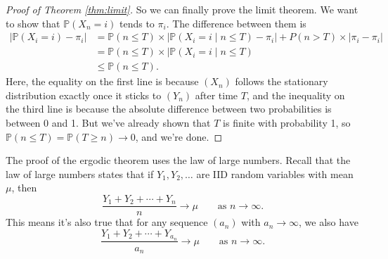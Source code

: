 \documentclass[
  a4paper,
]{article}
\theoremstyle{definition}
\theoremstyle{definition}
\theoremstyle{definition}
\theoremstyle{remark}
\begin{document}
\begin{proof}[Proof of Theorem \ref{thm:limit}]
So we can finally prove the limit theorem. We want to show that \(\mathbb P(X_n = i)\) tends to \(\pi_i\). The difference between them is
\begin{align*}
\big|\mathbb P(X_i = i) - \pi_i\big|
&= \mathbb P(n \leq T)\times\big|\mathbb P(X_i = i \mid n \leq T) - \pi_i\big|  + P(n > T) \times |\pi_i - \pi_i| \\
&= \mathbb P(n \leq T)\times\big|\mathbb P(X_i = i \mid n \leq T) \\
&\leq \mathbb P(n \leq T) .
\end{align*}
Here, the equality on the first line is because \((X_n)\) follows the stationary distribution exactly once it sticks to \((Y_n)\) after time \(T\), and the inequality on the third line is because the absolute difference between two probabilities is between 0 and 1. But we've already shown that \(T\) is finite with probability 1, so \(\mathbb P(n \leq T) = \mathbb P(T \geq n) \to 0\), and we're done.

\end{proof}

The proof of the ergodic theorem uses the law of large numbers. Recall that the law of large numbers states that if \(Y_1, Y_2, \dots\) are IID random variables with mean \(\mu\), then
\[ \frac{Y_1 + Y_2 + \cdots + Y_n}{n} \to \mu \qquad \text{as $n \to \infty$}. \]
This means it's also true that for any sequence \((a_n)\) with \(a_n \to \infty\), we also have
\[ \frac{Y_1 + Y_2 + \cdots + Y_{a_n}}{a_n} \to \mu \qquad \text{as $n \to \infty$}. \]
\end{document}

